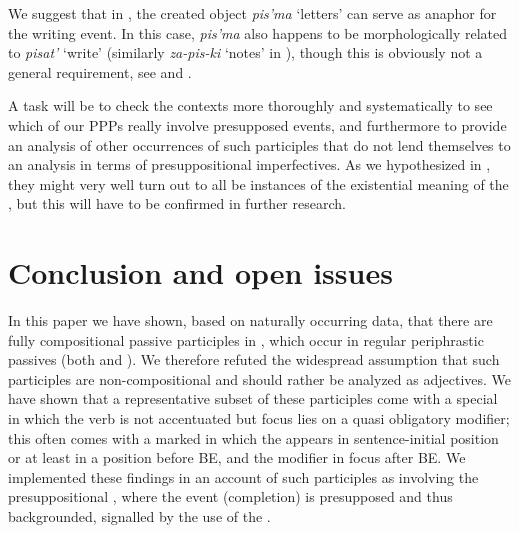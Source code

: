 \documentclass[output=paper,modfonts,newtxmath,hidelinks]{langscibook}
\begin{document}
\noindent We suggest that in , the created object \textit{pis'ma} `letters' can serve as anaphor for the writing event. In this case, \textit{pis'ma} also happens to be morphologically related to \textit{pisat'} `write' (similarly \textit{za-pis-ki} `notes' in ), though this is obviously not a general requirement, see   and .

A  task will be to check the contexts more thoroughly and systematically to see which of our  PPPs really involve presupposed events, and furthermore to provide an analysis of other occurrences of such participles that do not lend themselves to an analysis in terms of presuppositional imperfectives. As we hypothesized in , they might very well turn out to all be instances of the existential meaning of the , but this will have to be confirmed in further research.

\section{Conclusion and open issues}
\label{concl}

In this paper we have shown, based on naturally occurring data, that there are fully compositional   passive participles in , which occur in regular periphrastic passives (both  and ). We therefore refuted the widespread assumption that such participles are non-compositional and should rather be analyzed as adjectives. We have shown that a representative subset of these participles come with a special  in which the verb is not accentuated but focus lies on a quasi obligatory modifier; this often comes with a marked  in which the  appears in sentence-initial position or at least in a position before BE, and the modifier in focus after BE. We implemented these findings in an account of such participles as involving the presuppositional , where the event (completion) is presupposed and thus backgrounded, signalled by the use of the .
\end{document}
